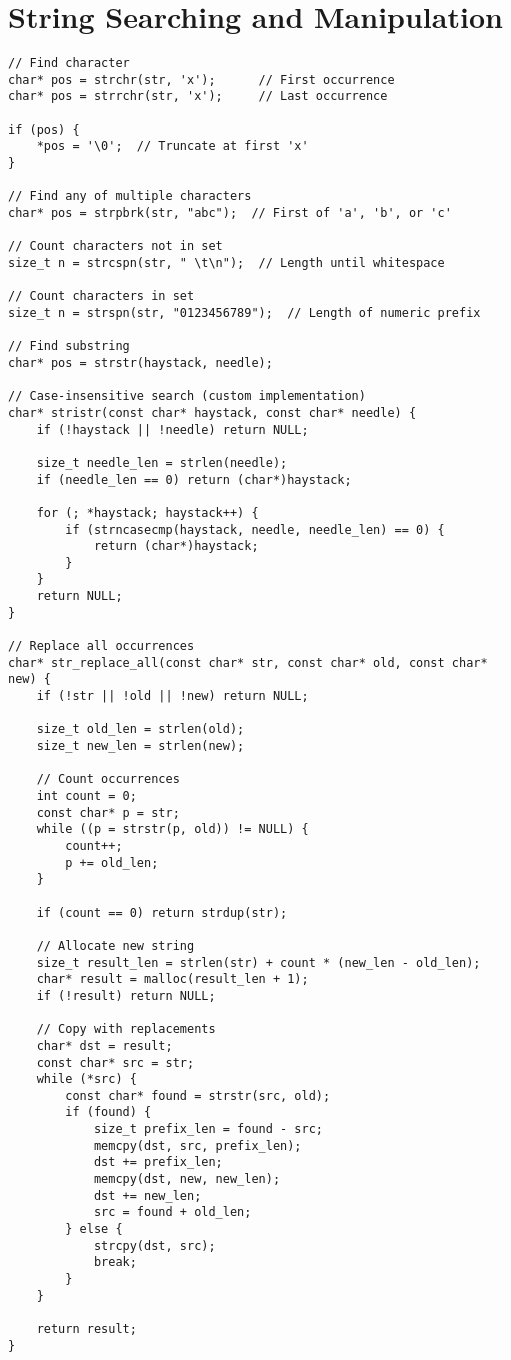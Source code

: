 \section{String Searching and Manipulation}

\begin{lstlisting}
// Find character
char* pos = strchr(str, 'x');      // First occurrence
char* pos = strrchr(str, 'x');     // Last occurrence

if (pos) {
    *pos = '\0';  // Truncate at first 'x'
}

// Find any of multiple characters
char* pos = strpbrk(str, "abc");  // First of 'a', 'b', or 'c'

// Count characters not in set
size_t n = strcspn(str, " \t\n");  // Length until whitespace

// Count characters in set
size_t n = strspn(str, "0123456789");  // Length of numeric prefix

// Find substring
char* pos = strstr(haystack, needle);

// Case-insensitive search (custom implementation)
char* stristr(const char* haystack, const char* needle) {
    if (!haystack || !needle) return NULL;

    size_t needle_len = strlen(needle);
    if (needle_len == 0) return (char*)haystack;

    for (; *haystack; haystack++) {
        if (strncasecmp(haystack, needle, needle_len) == 0) {
            return (char*)haystack;
        }
    }
    return NULL;
}

// Replace all occurrences
char* str_replace_all(const char* str, const char* old, const char* new) {
    if (!str || !old || !new) return NULL;

    size_t old_len = strlen(old);
    size_t new_len = strlen(new);

    // Count occurrences
    int count = 0;
    const char* p = str;
    while ((p = strstr(p, old)) != NULL) {
        count++;
        p += old_len;
    }

    if (count == 0) return strdup(str);

    // Allocate new string
    size_t result_len = strlen(str) + count * (new_len - old_len);
    char* result = malloc(result_len + 1);
    if (!result) return NULL;

    // Copy with replacements
    char* dst = result;
    const char* src = str;
    while (*src) {
        const char* found = strstr(src, old);
        if (found) {
            size_t prefix_len = found - src;
            memcpy(dst, src, prefix_len);
            dst += prefix_len;
            memcpy(dst, new, new_len);
            dst += new_len;
            src = found + old_len;
        } else {
            strcpy(dst, src);
            break;
        }
    }

    return result;
}
\end{lstlisting}

